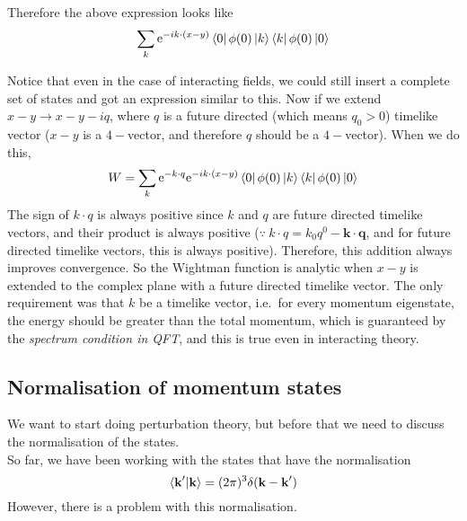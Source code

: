 \documentclass[11pt]{article}
\newcommand{\e}{\mathrm{e}}
\numberwithin{equation}{section}
\begin{document}
    Therefore the above expression looks like 
    \begin{equation*}
        \sum_k \e^{-ik\cdot (x - y)}  \bra{0} \phi(0) \ket{k}   \bra{k}\phi(0) \ket{0}
    \end{equation*}

    Notice that even in the case of interacting fields, we could still insert a complete set of states and got an expression similar to this. Now if we extend \(x-y \to x-y - iq\), where \(q\) is a future directed (which means \(q_0 >0\)) timelike vector (\(x-y\) is a \(4-\)vector, and therefore \(q\) should be a \(4-\)vector). When we do this, 
    \begin{equation*}
        W = \sum_k \e^{-k\cdot q} \e^{-ik\cdot (x - y)}  \bra{0} \phi(0) \ket{k}   \bra{k}\phi(0) \ket{0}
    \end{equation*}
    The sign of \(k\cdot q\) is always positive since \(k\) and \(q\) are future directed timelike vectors, and their product is always positive (\(\because~k\cdot q = k_0q^0 - \textbf{k}\cdot \textbf{q}\), and for future directed timelike vectors, this is always positive). Therefore, this addition always improves convergence. So the Wightman function is analytic when \(x-y\) is extended to the complex plane with a future directed timelike vector. The only requirement was that \(k\) be a timelike vector, i.e.\ for every momentum eigenstate, the energy should be greater than the total momentum, which is guaranteed by the \textit{spectrum condition in QFT}, and this is true even in interacting theory. 


    \subsection{Normalisation of momentum states}
    We want to start doing perturbation theory, but before that we need to discuss the normalisation of the states. \\

    So far, we have been working with the states that have the normalisation 
    \begin{equation*}
        \braket{\textbf{k}'|\textbf{k}} = (2\pi)^3\delta(\textbf{k} - \textbf{k}')
    \end{equation*}
    However, there is a problem with this normalisation. \\
\end{document}
